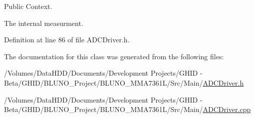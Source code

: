 \-Public \-Context. 

\-The internal measurment. 

\-Definition at line 86 of file \-A\-D\-C\-Driver.\-h.



\-The documentation for this class was generated from the following files\-:\begin{DoxyCompactItemize}
\item 
/\-Volumes/\-Data\-H\-D\-D/\-Documents/\-Development Projects/\-G\-H\-I\-D -\/ Beta/\-G\-H\-I\-D/\-B\-L\-U\-N\-O\-\_\-\-Project/\-B\-L\-U\-N\-O\-\_\-\-M\-M\-A7361\-L/\-Src/\-Main/\hyperlink{_a_d_c_driver_8h}{\-A\-D\-C\-Driver.\-h}\item 
/\-Volumes/\-Data\-H\-D\-D/\-Documents/\-Development Projects/\-G\-H\-I\-D -\/ Beta/\-G\-H\-I\-D/\-B\-L\-U\-N\-O\-\_\-\-Project/\-B\-L\-U\-N\-O\-\_\-\-M\-M\-A7361\-L/\-Src/\-Main/\hyperlink{_a_d_c_driver_8cpp}{\-A\-D\-C\-Driver.\-cpp}\end{DoxyCompactItemize}
